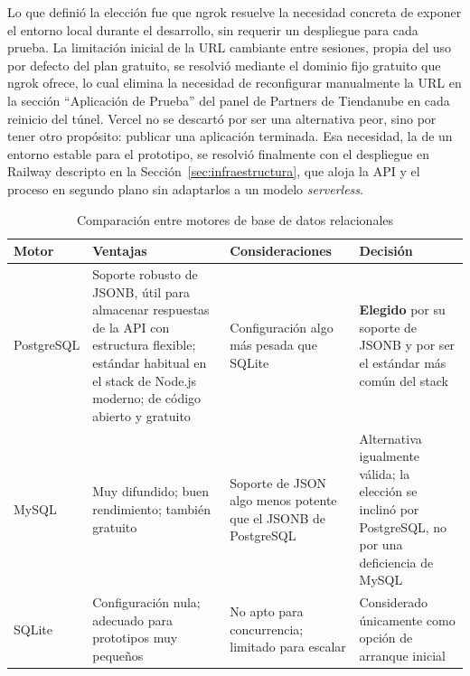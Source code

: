 Lo que definió la elección fue que ngrok resuelve la necesidad concreta de exponer el entorno local durante el desarrollo, sin requerir un despliegue para cada prueba. La limitación inicial de la URL cambiante entre sesiones, propia del uso por defecto del plan gratuito, se resolvió mediante el dominio fijo gratuito que ngrok ofrece, lo cual elimina la necesidad de reconfigurar manualmente la URL en la sección ``Aplicación de Prueba'' del panel de Partners de Tiendanube en cada reinicio del túnel. Vercel no se descartó por ser una alternativa peor, sino por tener otro propósito: publicar una aplicación terminada. Esa necesidad, la de un entorno estable para el prototipo, se resolvió finalmente con el despliegue en Railway descripto en la Sección~\ref{sec:infraestructura}, que aloja la API y el proceso en segundo plano sin adaptarlos a un modelo \emph{serverless}.

\begin{table}[h]
\centering
\caption{Comparación entre motores de base de datos relacionales}
\label{tab:comparativo_db_motor}
\renewcommand{\arraystretch}{1.3}
\begin{tabular}{|m{2.3cm}|m{4.4cm}|m{4.4cm}|m{3.4cm}|}
\hline
\textbf{Motor} & \textbf{Ventajas} & \textbf{Consideraciones} & \textbf{Decisión} \\
\hline
PostgreSQL & Soporte robusto de JSONB, útil para almacenar respuestas de la API con estructura flexible; estándar habitual en el stack de Node.js moderno; de código abierto y gratuito & Configuración algo más pesada que SQLite & \textbf{Elegido} por su soporte de JSONB y por ser el estándar más común del stack \\
\hline
MySQL & Muy difundido; buen rendimiento; también gratuito & Soporte de JSON algo menos potente que el JSONB de PostgreSQL & Alternativa igualmente válida; la elección se inclinó por PostgreSQL, no por una deficiencia de MySQL \\
\hline
SQLite & Configuración nula; adecuado para prototipos muy pequeños & No apto para concurrencia; limitado para escalar & Considerado únicamente como opción de arranque inicial \\
\hline
\end{tabular}
\end{table}

